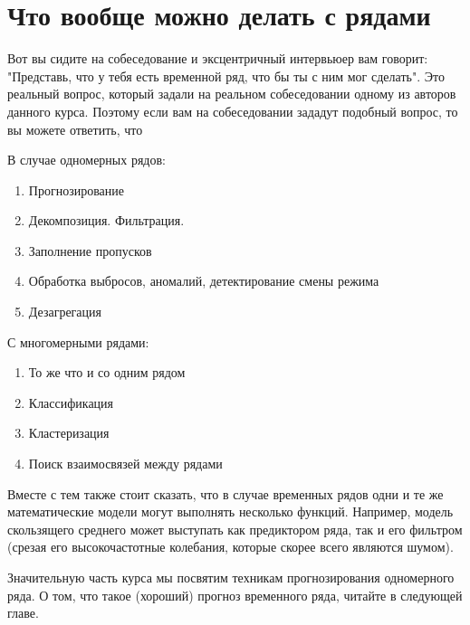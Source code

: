 \section{Что вообще можно делать с рядами}

Вот вы сидите на собеседование и эксцентричный интервьюер вам
говорит: "Представь, что у тебя есть временной ряд, что бы ты с ним
мог сделать". Это реальный вопрос, который задали на реальном
собеседовании одному из авторов данного курса. Поэтому если вам на
собеседовании зададут подобный вопрос, то вы можете ответить, что

В случае одномерных рядов:

\begin{enumerate}
  \item Прогнозирование
  \item Декомпозиция. Фильтрация.
  \item Заполнение пропусков
  \item Обработка выбросов, аномалий, детектирование смены режима
  \item Дезагрегация
\end{enumerate}

С многомерными рядами:

\begin{enumerate}
  \item То же что и со одним рядом
  \item Классификация
  \item Кластеризация
  \item Поиск взаимосвязей между рядами
\end{enumerate}

Вместе с тем также стоит сказать, что в случае временных рядов одни и
те же математические модели могут выполнять несколько функций.
Например, модель скользящего среднего может выступать как предиктором
ряда, так и его фильтром (срезая его высокочастотные колебания,
которые скорее всего являются шумом).

Значительную часть курса мы посвятим техникам прогнозирования
одномерного ряда. О том, что такое (хороший) прогноз временного ряда,
читайте в следующей главе.